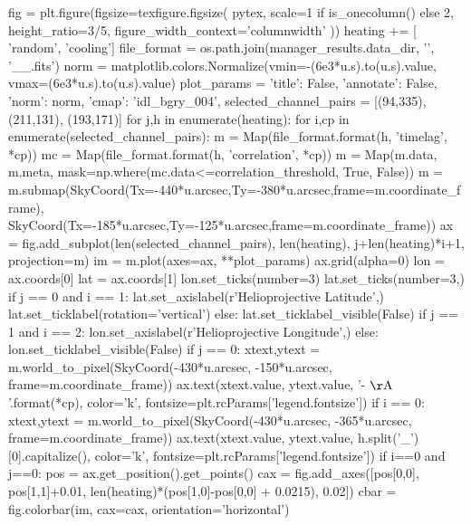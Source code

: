 \begin{pycode}
fig = plt.figure(figsize=texfigure.figsize(
    pytex,
    scale=1 if is_onecolumn() else 2,
    height_ratio=3/5,
    figure_width_context='columnwidth'
))
heating += [ 'random', 'cooling']
file_format = os.path.join(manager_results.data_dir, '{}', '{}_{}_{}.fits')
norm = matplotlib.colors.Normalize(vmin=-(6e3*u.s).to(u.s).value,
                                   vmax=(6e3*u.s).to(u.s).value)
plot_params = {'title': False, 'annotate': False, 'norm': norm, 'cmap': 'idl_bgry_004',}
selected_channel_pairs = [(94,335), (211,131), (193,171)]
for j,h in enumerate(heating):
    for i,cp in enumerate(selected_channel_pairs):
        m = Map(file_format.format(h, 'timelag', *cp))
        mc = Map(file_format.format(h, 'correlation', *cp))
        m = Map(m.data, m.meta, mask=np.where(mc.data<=correlation_threshold, True, False))
        m = m.submap(SkyCoord(Tx=-440*u.arcsec,Ty=-380*u.arcsec,frame=m.coordinate_frame),
                     SkyCoord(Tx=-185*u.arcsec,Ty=-125*u.arcsec,frame=m.coordinate_frame))
        ax = fig.add_subplot(len(selected_channel_pairs), len(heating), j+len(heating)*i+1,
                             projection=m)
        im = m.plot(axes=ax, **plot_params)
        ax.grid(alpha=0)
        lon = ax.coords[0]
        lat = ax.coords[1]
        lon.set_ticks(number=3)
        lat.set_ticks(number=3,) 
        if j == 0 and i == 1:
            lat.set_axislabel(r'Helioprojective Latitude',)
            lat.set_ticklabel(rotation='vertical')
        else:
            lat.set_ticklabel_visible(False)
        if j == 1 and i == 2:
            lon.set_axislabel(r'Helioprojective Longitude',)
        else:
            lon.set_ticklabel_visible(False)
        if j == 0:
            xtext,ytext = m.world_to_pixel(SkyCoord(-430*u.arcsec, -150*u.arcsec, frame=m.coordinate_frame))
            ax.text(xtext.value, ytext.value, '{}-{} $\mathrm{{\AA}}$'.format(*cp),
                    color='k', fontsize=plt.rcParams['legend.fontsize'])
        if i == 0:
            xtext,ytext = m.world_to_pixel(SkyCoord(-430*u.arcsec, -365*u.arcsec, frame=m.coordinate_frame))
            ax.text(xtext.value, ytext.value, h.split('_')[0].capitalize(),
                color='k', fontsize=plt.rcParams['legend.fontsize'])
        if i==0 and j==0:
            pos = ax.get_position().get_points()
            cax = fig.add_axes([pos[0,0], pos[1,1]+0.01, len(heating)*(pos[1,0]-pos[0,0] + 0.0215), 0.02])
            cbar = fig.colorbar(im, cax=cax, orientation='horizontal')

\end{pycode}
